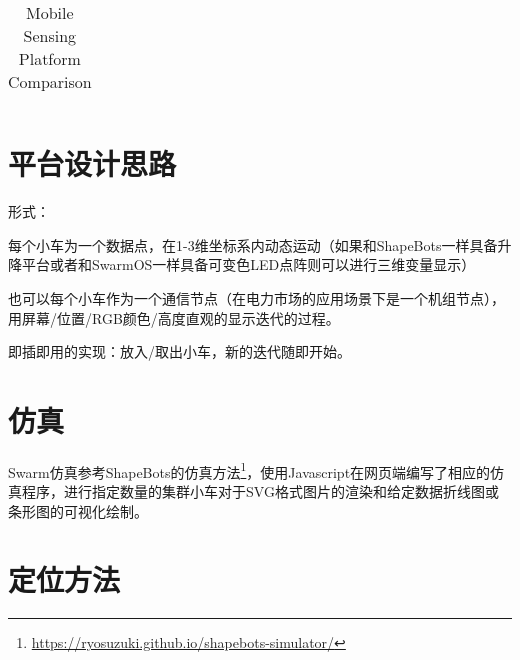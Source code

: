 \begin{landscape}
\begin{table}[htbp]
\begin{tabular}{lllllll}
    \end{tabular}
    \caption{Mobile Sensing Platform Comparison\cite{betthauser2014wolfbot}}
    \label{tab:Comparison}
    \end{table}
\end{landscape}

\section{平台设计思路}
形式：

每个小车为一个数据点，在1-3维坐标系内动态运动（如果和ShapeBots\cite{suzuki2019shapebots}一样具备升降平台或者和SwarmOS一样具备可变色LED点阵则可以进行三维变量显示）

也可以每个小车作为一个通信节点（在电力市场的应用场景下是一个机组节点），用屏幕/位置/RGB颜色/高度直观的显示迭代的过程。

即插即用的实现：放入/取出小车，新的迭代随即开始。

\section{仿真}

Swarm仿真参考ShapeBots\cite{suzuki2019shapebots}的仿真方法\footnote{\href{https://ryosuzuki.github.io/shapebots-simulator/}{https://ryosuzuki.github.io/shapebots-simulator/}}，使用Javascript在网页端编写了相应的仿真程序，进行指定数量的集群小车对于SVG格式图片的渲染和给定数据折线图或条形图的可视化绘制。

\section{定位方法}

%  

